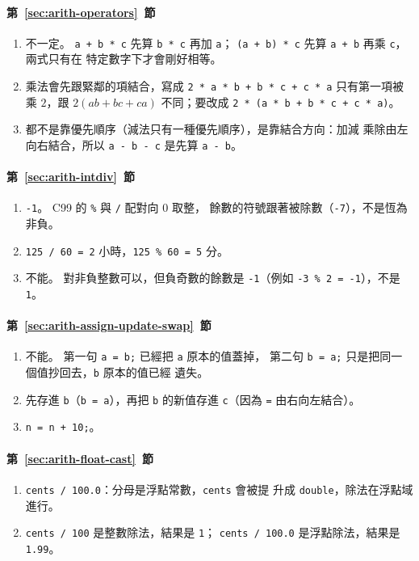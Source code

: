 \paragraph{第~\ref{sec:arith-operators}~節}
\begin{enumerate}
\item 不一定。 \texttt{a + b * c} 先算 \texttt{b * c} 再加 \texttt{a}；
\texttt{(a + b) * c} 先算 \texttt{a + b} 再乘 \texttt{c}，兩式只有在
特定數字下才會剛好相等。
\item 乘法會先跟緊鄰的項結合，寫成 \texttt{2 * a * b + b * c + c * a}
只有第一項被乘 $2$，跟 $2(ab+bc+ca)$ 不同；要改成
\texttt{2 * (a * b + b * c + c * a)}。
\item 都不是靠優先順序（減法只有一種優先順序），是靠結合方向：加減
乘除由左向右結合，所以 \texttt{a - b - c} 是先算 \texttt{a - b}。
\end{enumerate}

\paragraph{第~\ref{sec:arith-intdiv}~節}
\begin{enumerate}
\item \texttt{-1}。 C99 的 \texttt{\%} 與 \texttt{/} 配對向 $0$ 取整，
餘數的符號跟著被除數（\texttt{-7}），不是恆為非負。
\item \texttt{125 / 60 = 2} 小時，\texttt{125 \% 60 = 5} 分。
\item 不能。 對非負整數可以，但負奇數的餘數是 \texttt{-1}（例如
\texttt{-3 \% 2 = -1}），不是 \texttt{1}。
\end{enumerate}

\paragraph{第~\ref{sec:arith-assign-update-swap}~節}
\begin{enumerate}
\item 不能。 第一句 \texttt{a = b;} 已經把 \texttt{a} 原本的值蓋掉，
第二句 \texttt{b = a;} 只是把同一個值抄回去，\texttt{b} 原本的值已經
遺失。
\item 先存進 \texttt{b}（\texttt{b = a}），再把 \texttt{b} 的新值存進
\texttt{c}（因為 \texttt{=} 由右向左結合）。
\item \texttt{n = n + 10;}。
\end{enumerate}

\paragraph{第~\ref{sec:arith-float-cast}~節}
\begin{enumerate}
\item \texttt{cents / 100.0}：分母是浮點常數，\texttt{cents} 會被提
升成 \texttt{double}，除法在浮點域進行。
\item \texttt{cents / 100} 是整數除法，結果是 \texttt{1}；
\texttt{cents / 100.0} 是浮點除法，結果是 \texttt{1.99}。
\end{enumerate}

